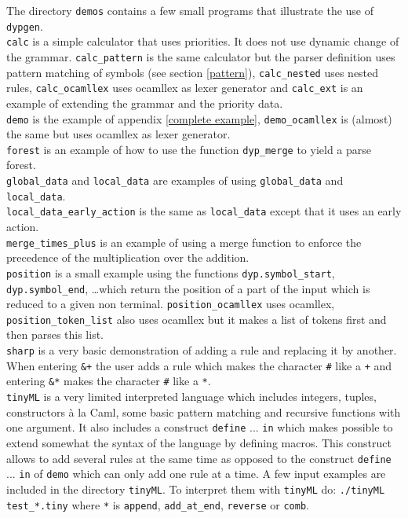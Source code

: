 \documentclass[12pt]{article}
\begin{document}
{The directory \verb|demos| contains a few small programs that illustrate the use of \verb|dypgen|.\\

\verb|calc| is a simple calculator that uses priorities. It does not use dynamic change of the grammar. \verb|calc_pattern| is the same calculator but the parser definition uses pattern matching of symbols (see section \ref{pattern}), \verb|calc_nested| uses nested rules, \verb|calc_ocamllex| uses ocamllex as lexer generator and \verb|calc_ext| is an example of extending the grammar and the priority data.\\

\verb|demo| is the example of appendix \ref{complete example}, \verb|demo_ocamllex| is (almost) the same but uses ocamllex as lexer generator.\\

\verb|forest| is an example of how to use the function \verb|dyp_merge| to yield a parse forest.\\

\verb|global_data| and \verb|local_data| are examples of using \verb|global_data| and \verb|local_data|.\\
\verb|local_data_early_action| is the same as \verb|local_data| except that it uses an early action.\\

\verb|merge_times_plus| is an example of using a merge function to enforce the precedence of the multiplication over the addition.\\

\verb|position| is a small example using the functions \verb|dyp.symbol_start|, \verb|dyp.symbol_end|, \ldots which return the position of a part of the input which is reduced to a given non terminal. \verb|position_ocamllex| uses ocamllex, \verb|position_token_list| also uses ocamllex but it makes a list of tokens first and then parses this list.\\

\verb|sharp| is a very basic demonstration of adding a rule and replacing it by another. When entering \verb|&+| the user adds a rule which makes the character \verb|#| like a \verb|+| and entering \verb|&*| makes the character \verb|#| like a \verb|*|.\\

\verb|tinyML| is a very limited interpreted language which includes integers, tuples, constructors \`a la Caml, some basic pattern matching and recursive functions with one argument. It also includes a construct \verb|define| ... \verb|in| which makes possible to extend somewhat the syntax of the language by defining macros. This construct allows to add several rules at the same time as opposed to the construct \verb|define| ... \verb|in| of \verb|demo| which can only add one rule at a time. A few input examples are included in the directory \verb|tinyML|. To interpret them with \verb|tinyML| do: \verb|./tinyML test_*.tiny| where \verb|*| is \verb|append|, \verb|add_at_end|, \verb|reverse| or \verb|comb|.\\

}
\end{document}
